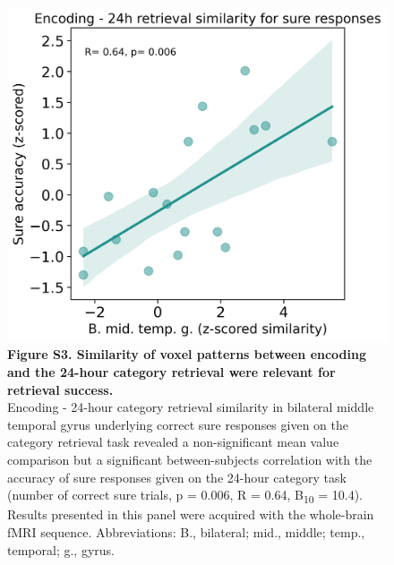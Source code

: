  \begin{figure}[!ht]
    \centering
     \includegraphics[width=0.6\linewidth]{paper/src/figures/20240530_wb-array_n__enc_ret2_perm_consc_consc-unconsc_incorr_B. mid. temp. g._ERS_correl.png}
     \caption*{\textbf{Figure S3. Similarity of voxel patterns between encoding and the 24-hour category retrieval were relevant for retrieval success.} \\ \vspace{0.5em}
   Encoding - 24-hour category retrieval similarity in bilateral middle temporal gyrus underlying correct sure responses given on the category retrieval task revealed a non-significant mean value comparison but a significant between-subjects correlation with the accuracy of sure responses given on the 24-hour category task (number of correct sure trials, p = 0.006, R = 0.64, B\textsubscript{10} = 10.4). Results presented in this panel were acquired with the whole-brain fMRI sequence. Abbreviations: B., bilateral; mid., middle; temp., temporal; g., gyrus.}
\end{figure}

\newpage

